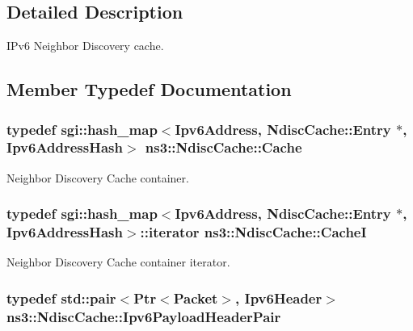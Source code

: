 \subsection{Detailed Description}
I\+Pv6 Neighbor Discovery cache. 

\subsection{Member Typedef Documentation}
\subsubsection[{\texorpdfstring{Cache}{Cache}}]{\setlength{\rightskip}{0pt plus 5cm}typedef sgi\+::hash\+\_\+map$<${\bf Ipv6\+Address}, {\bf Ndisc\+Cache\+::\+Entry} $\ast$, {\bf Ipv6\+Address\+Hash}$>$ {\bf ns3\+::\+Ndisc\+Cache\+::\+Cache}\hspace{0.3cm}{\ttfamily [private]}}\hypertarget{classns3_1_1NdiscCache_a1267c82e138fe8aac2cfd543e7aa7181}{}\label{classns3_1_1NdiscCache_a1267c82e138fe8aac2cfd543e7aa7181}


Neighbor Discovery Cache container. 

\subsubsection[{\texorpdfstring{CacheI}{CacheI}}]{\setlength{\rightskip}{0pt plus 5cm}typedef sgi\+::hash\+\_\+map$<${\bf Ipv6\+Address}, {\bf Ndisc\+Cache\+::\+Entry} $\ast$, {\bf Ipv6\+Address\+Hash}$>$\+::iterator {\bf ns3\+::\+Ndisc\+Cache\+::\+CacheI}\hspace{0.3cm}{\ttfamily [private]}}\hypertarget{classns3_1_1NdiscCache_ab7894f701404adbd60d92cf8af83ef01}{}\label{classns3_1_1NdiscCache_ab7894f701404adbd60d92cf8af83ef01}


Neighbor Discovery Cache container iterator. 

\subsubsection[{\texorpdfstring{Ipv6\+Payload\+Header\+Pair}{Ipv6PayloadHeaderPair}}]{\setlength{\rightskip}{0pt plus 5cm}typedef std\+::pair$<${\bf Ptr}$<${\bf Packet}$>$, {\bf Ipv6\+Header}$>$ {\bf ns3\+::\+Ndisc\+Cache\+::\+Ipv6\+Payload\+Header\+Pair}}\hypertarget{classns3_1_1NdiscCache_a29c07f4c9da0e923f442f6440666240e}{}\label{classns3_1_1NdiscCache_a29c07f4c9da0e923f442f6440666240e}


